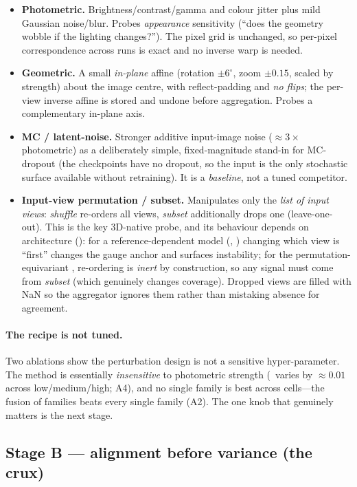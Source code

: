 \begin{itemize}[leftmargin=1.4em,itemsep=2pt,topsep=2pt]
\item \textbf{Photometric.} Brightness/contrast/gamma and colour jitter plus mild Gaussian
noise/blur. Probes \emph{appearance} sensitivity (``does the geometry wobble if the lighting
changes?''). The pixel grid is unchanged, so per-pixel correspondence across runs is exact and no
inverse warp is needed.
\item \textbf{Geometric.} A small \emph{in-plane} affine (rotation $\pm 6^\circ$, zoom $\pm 0.15$,
scaled by strength) about the image centre, with reflect-padding and \emph{no flips}; the per-view
inverse affine is stored and undone before aggregation. Probes a complementary in-plane axis.
\item \textbf{MC / latent-noise.} Stronger additive input-image noise ($\approx 3\times$ photometric)
as a deliberately simple, fixed-magnitude stand-in for MC-dropout (the checkpoints have no dropout, so
the input is the only stochastic surface available without retraining). It is a \emph{baseline}, not
a tuned competitor.
\item \textbf{Input-view permutation / subset.} Manipulates only the \emph{list of input views}:
\emph{shuffle} re-orders all views, \emph{subset} additionally drops one (leave-one-out). This is the
key 3D-native probe, and its behaviour depends on architecture (): for a
reference-dependent model (\vggt, \mastr) changing which view is ``first'' changes the gauge anchor
and surfaces instability; for the permutation-equivariant \pii, re-ordering is \emph{inert} by
construction, so any signal must come from \emph{subset} (which genuinely changes coverage). Dropped
views are filled with NaN so the aggregator ignores them rather than mistaking absence for agreement.
\end{itemize}

\paragraph{The recipe is not tuned.} Two ablations show the perturbation design is not a sensitive
hyper-parameter. The method is essentially \emph{insensitive} to photometric strength
(\ause\ varies by $\approx 0.01$ across low/medium/high; A4), and no single family is best across
cells---the fusion of families beats every single family (A2). The one knob that genuinely matters is
the next stage.

\subsection{Stage B --- alignment before variance (the crux)}
\label{sec:method-align}

